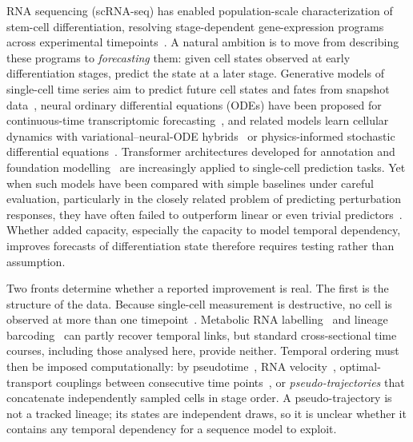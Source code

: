 \documentclass[10pt,journal,compsoc]{IEEEtran}
\begin{document}
\IEEEdisplaynontitleabstractindextext

\IEEEpeerreviewmaketitle



 RNA sequencing (scRNA-seq) has enabled population-scale characterization of stem-cell differentiation, resolving stage-dependent gene-expression programs across experimental timepoints~\cite{jerber2021population}. A natural ambition is to move from describing these programs to \emph{forecasting} them: given cell states observed at early differentiation stages, predict the state at a later stage. Generative models of single-cell time series aim to predict future cell states and fates from snapshot data~\cite{yeo2021prescient,tong2020trajectorynet}, neural ordinary differential equations (ODEs) have been proposed for continuous-time transcriptomic forecasting~\cite{erbe2023transcriptomic}, and related models learn cellular dynamics with variational--neural-ODE hybrids~\cite{farrell2023inferring} or physics-informed stochastic differential equations~\cite{jiang2024physics}. Transformer architectures developed for annotation and foundation modelling~\cite{chen2023transformer,cui2024scgpt} are increasingly applied to single-cell prediction tasks. Yet when such models have been compared with simple baselines under careful evaluation, particularly in the closely related problem of predicting perturbation responses, they have often failed to outperform linear or even trivial predictors~\cite{ahlmanneltze2025deep,kernfeld2023systematic}. Whether added capacity, especially the capacity to model temporal dependency, improves forecasts of differentiation state therefore requires testing rather than assumption.

Two fronts determine whether a reported improvement is real. The first is the structure of the data. Because single-cell measurement is destructive, no cell is observed at more than one timepoint~\cite{la2018rna}. Metabolic RNA labelling~\cite{erhard2019scslam,cao2020scifate} and lineage barcoding~\cite{weinreb2020lineage} can partly recover temporal links, but standard cross-sectional time courses, including those analysed here, provide neither. Temporal ordering must then be imposed computationally: by pseudotime~\cite{saelens2019comparison,haghverdi2016diffusion}, RNA velocity~\cite{la2018rna,bergen2020generalizing}, optimal-transport couplings between consecutive time points~\cite{schiebinger2019optimal,lavenant2024toward}, or \emph{pseudo-trajectories} that concatenate independently sampled cells in stage order. A pseudo-trajectory is not a tracked lineage; its states are independent draws, so it is unclear whether it contains any temporal dependency for a sequence model to exploit.
\end{document}

